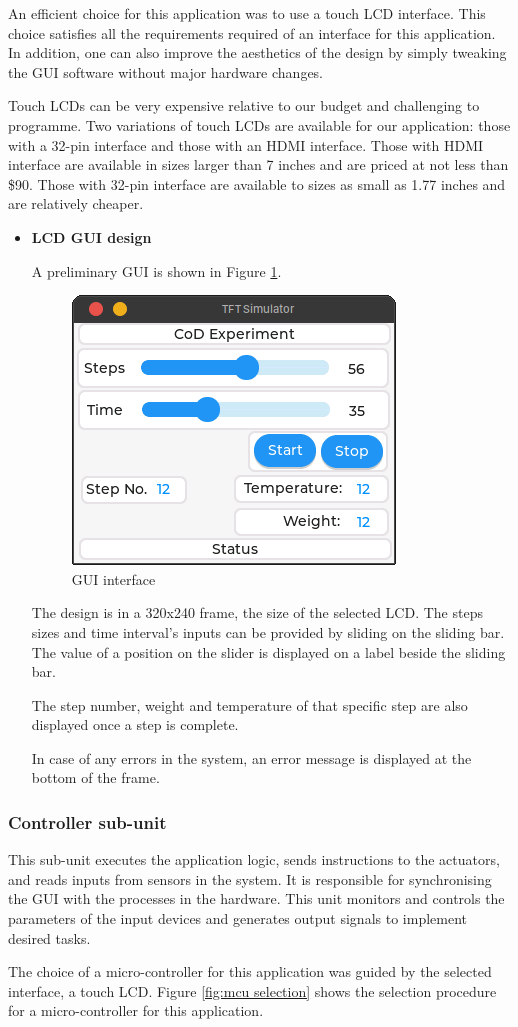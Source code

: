  An efficient choice for this application was to use a touch LCD interface. This choice satisfies all the requirements required of an interface for this application. In addition, one can also improve the aesthetics of the design by simply tweaking the GUI software without major hardware changes.
 \par
 Touch LCDs can be very expensive relative to our budget and challenging to programme. Two variations of touch LCDs are available for our application: those with a 32-pin interface and those with an HDMI interface. Those with HDMI interface are available in sizes larger than 7 inches and are priced at not less than \$90. Those with 32-pin interface are available to sizes as small as 1.77 inches and are relatively cheaper.    
\begin{itemize}
    \item \textbf{LCD GUI design}
    \par
    A preliminary GUI is shown in Figure \ref{fig:GUI_interface}.
    \begin{figure}[H]
        \centering
        \includegraphics[width=.32\textwidth, height=.24\textheight]{Figures/interfacedesign.png}
        \caption{GUI interface}
        \label{fig:GUI_interface}
    \end{figure}
    The design is in a 320x240 frame, the size of the selected LCD. The steps sizes and time interval's inputs can be provided by sliding on the sliding bar. The value of a position on the slider is displayed on a label beside the sliding bar.
    \par
    The step number, weight and temperature of that specific step are also displayed once a step is complete.
    \par
    In case of any errors in the system, an error message is displayed at the bottom of the frame.
\end{itemize}

\subsubsection{Controller sub-unit}
This sub-unit executes the application logic, sends instructions to the actuators, and reads inputs from sensors in the system. It is responsible for synchronising the GUI with the processes in the hardware. This unit monitors and controls the parameters of the input devices and generates output signals to implement desired tasks.
\par
The choice of a micro-controller for this application was guided by the selected interface, a touch LCD. Figure \ref{fig:mcu selection} shows the selection procedure for a micro-controller for this application.

